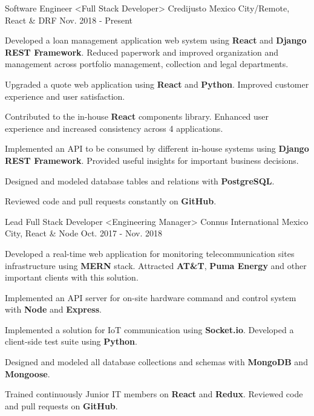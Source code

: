 \begin{cventries}
  \cventry
    {Software Engineer <Full Stack Developer>}
    {Credijusto}
    {Mexico City/Remote, React \& DRF}
    {Nov. 2018 - Present}
    {
      \begin{cvitems}
        \item {Developed a loan management application web system using \textbf{React} and \textbf{Django REST Framework}. Reduced paperwork and improved organization and management across portfolio management, collection and legal departments.}
        \item {Upgraded a quote web application using \textbf{React} and \textbf{Python}. Improved customer experience and user satisfaction.}
        \item {Contributed to the in-house \textbf{React} components library. Enhanced user experience and increased consistency across 4 applications.}
        \item {Implemented an API to be consumed by different in-house systems using \textbf{Django REST Framework}. Provided useful insights for important business decisions.}
        \item {Designed and modeled database tables and relations with \textbf{PostgreSQL}.}
        \item {Reviewed code and pull requests constantly on \textbf{GitHub}.}
      \end{cvitems}
    }
  \cventry
    {Lead Full Stack Developer <Engineering Manager>}
    {Connus International}
    {Mexico City, React \& Node}
    {Oct. 2017 - Nov. 2018}
    {
      \begin{cvitems}
        \item {Developed a real-time web application for monitoring telecommunication sites infrastructure using \textbf{MERN} stack. Attracted \textbf{AT\&T}, \textbf{Puma Energy} and other important clients with this solution.}
        \item {Implemented an API server for on-site hardware command and control system with \textbf{Node} and \textbf{Express}.}
        \item {Implemented a solution for IoT communication using \textbf{Socket.io}. Developed a client-side test suite using \textbf{Python}.}
        \item {Designed and modeled all database collections and schemas with \textbf{MongoDB} and \textbf{Mongoose}.}
        \item {Trained continuously Junior IT members on \textbf{React} and \textbf{Redux}. Reviewed code and pull requests on \textbf{GitHub}.}

\end{cvitems}}
\end{cventries}
